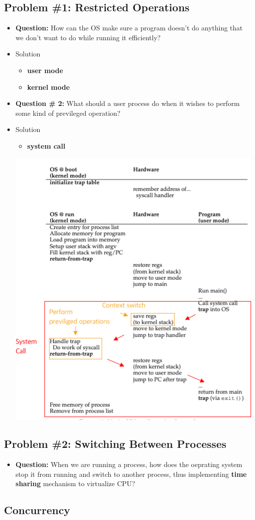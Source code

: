 \documentclass[12pt]{article}
\begin{document}
\subsection{Problem \#1: Restricted Operations}
\begin{itemize}
    \item \textbf{Question:} How can the OS make sure a program doesn't do anything that we
    don't want to do while running it efficiently?
    \item Solution
    \begin{itemize}
        \item \textbf{user mode}
        \item \textbf{kernel mode}
    \end{itemize}
    \item \textbf{Question \# 2:} What should a user process do when it wishes to perform
    some kind of previleged operation?
    \item Solution
    \begin{itemize}
        \item \textbf{system call}
    \end{itemize}

    \begin{center}
    \includegraphics[width=0.6\linewidth]{images/notes_4_9.png}
    \end{center}
\end{itemize}

\subsection{Problem \#2: Switching Between Processes}
\begin{itemize}
    \item \textbf{Question:} When we are running a process, how does the oeprating system stop it
    from running and switch to another process, thus implementing \textbf{time sharing} mechanism
    to virtualize CPU?
\end{itemize}

\subsection{Concurrency}
\end{document}
